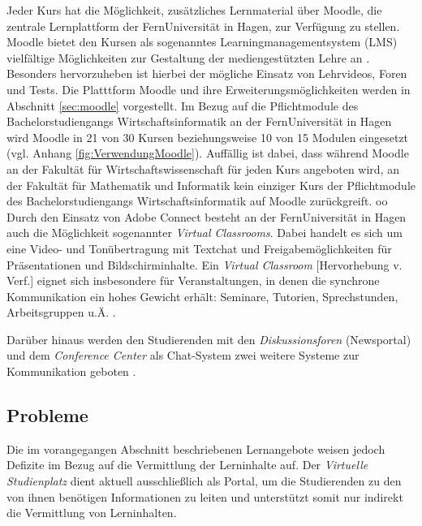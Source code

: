 Jeder Kurs hat die Möglichkeit, zusätzliches Lernmaterial über Moodle, die zentrale Lernplattform der FernUniversität in Hagen, zur Verfügung zu stellen. Moodle bietet den Kursen \glqq als sogenanntes Learningmanagementsystem (LMS) vielfältige Möglichkeiten zur Gestaltung der mediengestützten Lehre an\grqq{} \citep{fernuniversitaet2018moodle}. Besonders hervorzuheben ist hierbei der mögliche Einsatz von Lehrvideos, Foren und Tests. Die Platttform Moodle und ihre Erweiterungsmöglichkeiten werden in Abschnitt \ref{sec:moodle} vorgestellt. Im Bezug auf die Pflichtmodule des Bachelorstudiengangs Wirtschaftsinformatik an der FernUniversität in Hagen wird Moodle in 21 von 30 Kursen beziehungsweise 10 von 15 Modulen eingesetzt (vgl. Anhang \ref{fig:VerwendungMoodle}).  Auffällig ist dabei, dass während Moodle an der Fakultät für Wirtschaftswissenschaft für jeden Kurs angeboten wird, an der Fakultät für Mathematik und Informatik kein einziger Kurs der Pflichtmodule des Bachelorstudiengangs Wirtschaftsinformatik auf Moodle zurückgreift.
oo
Durch den Einsatz von Adobe Connect besteht an der FernUniversität in Hagen auch die Möglichkeit sogenannter \textit{Virtual Classrooms}. Dabei handelt es sich um eine Video- und Tonübertragung mit Textchat und Freigabemöglichkeiten für Präsentationen und Bildschirminhalte. \glqq Ein \emph{Virtual Classroom} [Hervorhebung v. Verf.] eignet sich insbesondere für Veranstaltungen, in denen die synchrone Kommunikation ein hohes Gewicht erhält: Seminare, Tutorien, Sprechstunden, Arbeitsgruppen u.Ä.\grqq{} \citep{fernuniversitaet2018kommunikationstools}.

Darüber hinaus werden den Studierenden mit den \textit{Diskussionsforen} (Newsportal) und dem \textit{Conference Center} als Chat-System zwei weitere Systeme zur Kommunikation geboten \citep{fernuniversitaet2018kommunikationstools}.


\subsection{Probleme}
Die im vorangegangen Abschnitt beschriebenen Lernangebote weisen jedoch Defizite im Bezug auf die Vermittlung der Lerninhalte auf. Der \textit{Virtuelle Studienplatz} dient aktuell ausschließlich als Portal, um die Studierenden zu den von ihnen benötigen Informationen zu leiten und unterstützt somit nur indirekt die Vermittlung von Lerninhalten.

